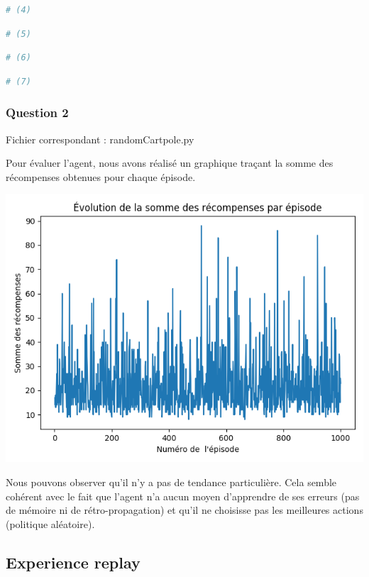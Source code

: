 \documentclass[10pt,a4paper]{article}
\begin{document}
\begin{lstlisting}[language=Python]
# (4)
\end{lstlisting}

\begin{lstlisting}[language=Python]
# (5)
\end{lstlisting}

\begin{lstlisting}[language=Python]
# (6)
\end{lstlisting}

\begin{lstlisting}[language=Python]
# (7)
\end{lstlisting}

\subsubsection{Question 2}

Fichier correspondant : randomCartpole.py

Pour évaluer l'agent, nous avons réalisé un graphique traçant la somme des récompenses obtenues pour chaque épisode.

\includegraphics[scale=0.5]{evolution_recompenses_random.png} 

Nous pouvons observer qu'il n'y a pas de tendance particulière. Cela semble cohérent avec le fait que l'agent n'a aucun moyen d'apprendre de ses erreurs (pas de mémoire ni de rétro-propagation) et qu'il ne choisisse pas les meilleures actions (politique aléatoire).

\subsection{Experience replay}
\end{document}
